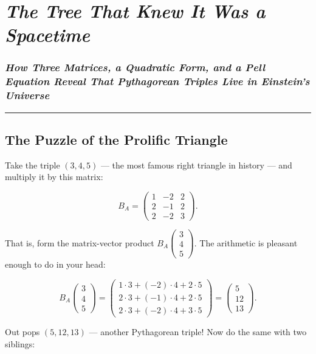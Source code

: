 \chapter{\texorpdfstring{\emph{The Tree That Knew It Was a Spacetime}}{The Tree That Knew It Was a Spacetime}}
\subsection{\texorpdfstring{\emph{How Three Matrices, a Quadratic Form, and a Pell Equation Reveal That Pythagorean Triples Live in Einstein's Universe}}{How Three Matrices, a Quadratic Form, and a Pell Equation Reveal That Pythagorean Triples Live in Einstein's Universe}}
\bigskip\noindent\rule{\linewidth}{0.4pt}\bigskip

\section{The Puzzle of the Prolific Triangle}
Take the triple \((3, 4, 5)\) --- the most famous right triangle in history --- and multiply it by this matrix:

\[B_A = \begin{pmatrix} 1 & -2 & 2 \\ 2 & -1 & 2 \\ 2 & -2 & 3 \end{pmatrix}.\]

That is, form the matrix-vector product \(B_A \begin{pmatrix} 3 \\ 4 \\ 5 \end{pmatrix}\). The arithmetic is pleasant enough to do in your head:

\[B_A \begin{pmatrix} 3 \\ 4 \\ 5 \end{pmatrix} = \begin{pmatrix} 1\cdot3 + (-2)\cdot4 + 2\cdot5 \\ 2\cdot3 + (-1)\cdot4 + 2\cdot5 \\ 2\cdot3 + (-2)\cdot4 + 3\cdot5 \end{pmatrix} = \begin{pmatrix} 5 \\ 12 \\ 13 \end{pmatrix}.\]

Out pops \((5, 12, 13)\) --- another Pythagorean triple! Now do the same with two siblings:

